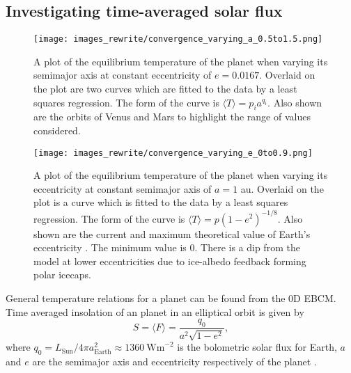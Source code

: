 \documentclass[12pt, onecolumn]{revtex4-2}    %
\begin{document}
\subsection{Investigating time-averaged solar flux} \label{ssec:InvTimeAveragedSolarFlux}

\begin{figure}
  \texttt{[image: images\_rewrite/convergence\_varying\_a\_0.5to1.5.png]}
  \caption{
    A plot of the equilibrium temperature of the planet when varying its semimajor axis at constant eccentricity of $e=0.0167$.
    Overlaid on the plot are two curves which are fitted to the data by a least squares regression.
    The form of the curve is $\langle T \rangle = p_i a^{q_i}$.
    Also shown are the orbits of Venus and Mars to highlight the range of values considered.
  }
  \label{fig:planet_semimajoraxis}
\end{figure}

\begin{figure}
  \texttt{[image: images\_rewrite/convergence\_varying\_e\_0to0.9.png]}
  \caption{
    A plot of the equilibrium temperature of the planet when varying its eccentricity at constant semimajor axis of $a = 1$ au.
    Overlaid on the plot is a curve which is fitted to the data by a least squares regression.
    The form of the curve is $\langle T \rangle = p(1-e^2)^{-1/8}$.
    Also shown are the current and maximum theoretical value of Earth's eccentricity \cite{LA2010}.
    The minimum value is $0$.
    There is a dip from the model at lower eccentricities due to ice-albedo feedback forming polar icecaps.
  }
  \label{fig:planet_eccentricity}
\end{figure}

General temperature relations for a planet can be found from the 0D EBCM.
Time averaged insolation of an planet in an elliptical orbit is given by
\begin{equation}
  S = \langle F \rangle = \frac{q_0}{a^2 \sqrt{1-e^2}} \label{eq:avgInsolation},
\end{equation}
where $q_0 = L_{\text{Sun}}/4\pi a_{\text{Earth}}^2 \approx 1360 \ \text{Wm}^{-2}$ is the bolometric solar flux for Earth, $a$ and $e$ are the semimajor axis and eccentricity respectively of the planet \cite{Mendez2017}.
\end{document}
